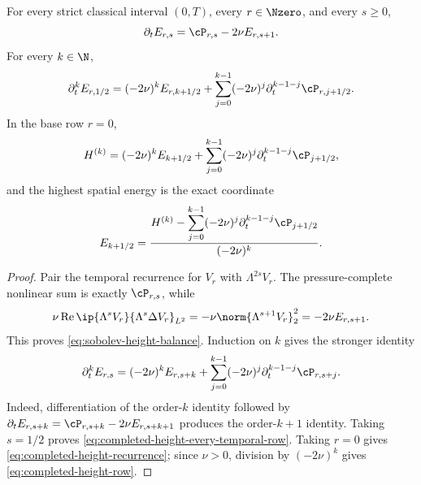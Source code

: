 \begin{proposition}
\label{prop:completed-height-recurrence}
For every strict classical interval \((0,T)\), every \(r\in\Nzero\), and
every \(s\ge0\),
\begin{equation}
 \partial_tE_{r,s}=\cP_{r,s}-2\nu E_{r,s+1}.
 \label{eq:sobolev-height-balance}
\end{equation}
For every \(k\in\N\),
\begin{equation}
 \partial_t^kE_{r,1/2}
 =(-2\nu)^kE_{r,k+1/2}
 +\sum_{j=0}^{k-1}(-2\nu)^j
   \partial_t^{k-1-j}\cP_{r,j+1/2}.
 \label{eq:completed-height-every-temporal-row}
\end{equation}
In the base row \(r=0\),
\begin{equation}
 H^{(k)}
 =(-2\nu)^kE_{k+1/2}
 +\sum_{j=0}^{k-1}(-2\nu)^j
   \partial_t^{k-1-j}\cP_{j+1/2},
 \label{eq:completed-height-recurrence}
\end{equation}
and the highest spatial energy is the exact coordinate
\begin{equation}
 E_{k+1/2}
 =\frac{H^{(k)}-
   \displaystyle\sum_{j=0}^{k-1}(-2\nu)^j
   \partial_t^{k-1-j}\cP_{j+1/2}}
 {(-2\nu)^k}.
 \label{eq:completed-height-row}
\end{equation}
\end{proposition}

\begin{proof}
Pair the temporal recurrence for \(V_r\) with \(\Lambda^{2s}V_r\).
The pressure-complete nonlinear sum is exactly \(\cP_{r,s}\), while
\[
 \nu\operatorname{Re}\ip{\Lambda^sV_r}{\Lambda^s\Delta V_r}_{L^2}
 =-\nu\norm{\Lambda^{s+1}V_r}_2^2=-2\nu E_{r,s+1}.
\]
This proves \eqref{eq:sobolev-height-balance}.  Induction on \(k\) gives
the stronger identity
\begin{equation}
 \partial_t^kE_{r,s}
 =(-2\nu)^kE_{r,s+k}
 +\sum_{j=0}^{k-1}(-2\nu)^j
   \partial_t^{k-1-j}\cP_{r,s+j}.
 \label{eq:all-height-recurrence}
\end{equation}
Indeed, differentiation of the order-\(k\) identity followed by
\(\partial_tE_{r,s+k}=\cP_{r,s+k}-2\nu E_{r,s+k+1}\) produces the
order-\(k+1\) identity.  Taking \(s=1/2\) proves
\eqref{eq:completed-height-every-temporal-row}.  Taking \(r=0\) gives
\eqref{eq:completed-height-recurrence}; since \(\nu>0\), division by
\((-2\nu)^k\) gives \eqref{eq:completed-height-row}.
\end{proof}

